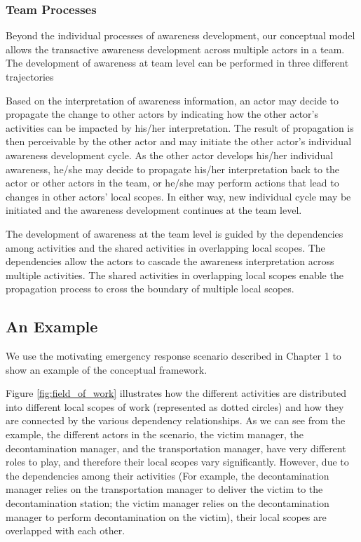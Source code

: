 
\subsubsection{Team Processes} %
\label{ssub:interactive_processes}

Beyond the individual processes of awareness development, our conceptual model allows the transactive awareness development across multiple actors in a team. The development of awareness at team level can be performed in three different trajectories

Based on the interpretation of awareness information, an actor may decide to propagate the change to other actors by indicating how the other actor's activities can be impacted by his/her interpretation. The result of propagation is then perceivable by the other actor and may initiate the other actor's individual awareness development cycle. As the other actor develops his/her individual awareness, he/she may decide to propagate his/her interpretation back to the actor or other actors in the team, or he/she may perform actions that lead to changes in other actors' local scopes. In either way, new individual cycle may be initiated and the awareness development continues at the team level.

The development of awareness at the team level is guided by the dependencies among activities and the shared activities in overlapping local scopes. The dependencies allow the actors to cascade the awareness interpretation across multiple activities. The shared activities in overlapping local scopes enable the propagation process to cross the boundary of multiple local scopes.

\subsection{An Example} %
\label{sub:an_example}
We use the motivating emergency response scenario described in Chapter 1 to show an example of the conceptual framework. 

Figure \ref{fig:field_of_work} illustrates how the different activities are distributed into different local scopes of work (represented as dotted circles) and how they are connected by the various dependency relationships. As we can see from the example, the different actors in the scenario, the victim manager, the decontamination manager, and the transportation manager, have very different roles to play, and therefore their local scopes vary significantly. However, due to the dependencies among their activities (For example, the decontamination manager relies on the transportation manager to deliver the victim to the decontamination station; the victim manager relies on the decontamination manager to perform decontamination on the victim), their local scopes are overlapped with each other.

